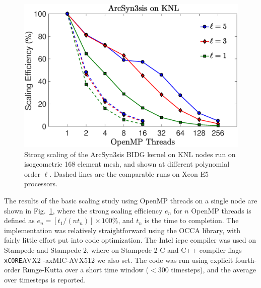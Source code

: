 \begin{figure}
\begin{center}
\includegraphics[width=0.99\linewidth]{./bidg_data/2nd_try/scaling_pS}
\end{center}
\vspace*{-.5cm}
\caption{Strong scaling of the ArcSyn3sis BIDG kernel on KNL nodes run on
isogeometric 168 element mesh, and shown at different polynomial order $\ell$.  Dashed lines are the comparable runs on Xeon E5 processors.}
\label{fig:bidg_scaling}
\end{figure}

 

The results of the basic scaling study using OpenMP threads on a single node are shown in
Fig.~\ref{fig:bidg_scaling}, where the strong scaling efficiency $e_{n}$ for
$n$ OpenMP threads is defined as $e_{n}= [t_{1}/(nt_{n})]\times 100\%$, and $t_n$ is the time to
completion. The implementation was relatively straightforward using the OCCA library, with fairly little effort put into code optimization.  The Intel icpc compiler was used on Stampede and Stampede 2, where on Stampede 2 C and C++ compiler flags {\verb -xCORE-AVX2  -axMIC-AVX512} we also set.  The code was run using explicit fourth-order Runge-Kutta over a short time window ($< 300$ timesteps), and the average over timesteps is reported.  



